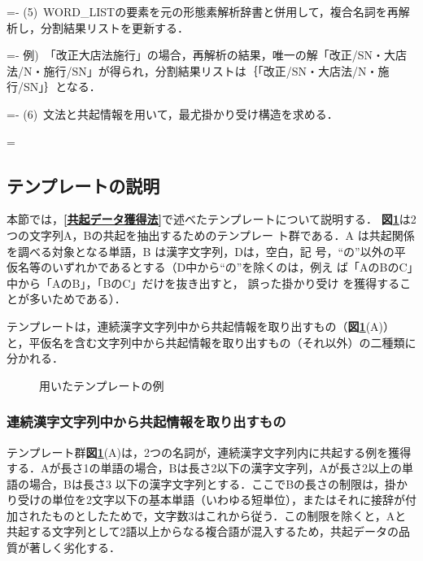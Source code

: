 \settowidth{\leftskip}{(5)\ }
\settowidth{\parindent}{(5)\ }
\parindent=-\parindent
(5)\ WORD\_LISTの要素を元の形態素解析辞書と併用して，複合名詞を再解析し，分割結果リストを更新する．

\settowidth{\parindent}{例)\ }
\parindent=-\parindent
例)\ 「改正大店法施行」の場合，再解析の結果，唯一の解「改正/SN・大店法/N・施行/SN」が得られ，分割結果リストは｛「改正/SN・大店法/N・施行/SN」｝となる．

\settowidth{\leftskip}{(6)\ }
\settowidth{\parindent}{(6)\ }
\parindent=-\parindent
(6)\ 文法と共起情報を用いて，最尤掛かり受け構造を求める．

\parindent=\originalparindent
\leftskip=0mm
\rightskip=0mm

\subsection{テンプレートの説明}\label{テンプレートの説明}
本節では，{\bf \ref{共起データ獲得法}}で述べたテンプレートについて説明する．
{\bf 図\ref{fig:templates}}は2つの文字列A，Bの共起を抽出するためのテンプレー
ト群である．A は共起関係を調べる対象となる単語，B は漢字文字列，Dは，空白，記
号，“の”以外の平仮名等のいずれかであるとする（D中から“の”を除くのは，例え
ば「AのBのC」中から「AのB」，「BのC」だけを抜き出すと，
誤った掛かり受け\break
を獲得することが多いためである）．

テンプレートは，連続漢字文字列中から共起情報を取り出すもの（{\bf 図\ref{fig:templates}}(A)）と，平仮名を含む文字列中から共起情報を取り出すもの（それ以外）の二種類に分かれる．

\begin{figure}[tbp]
  \begin{center}
    \leavevmode
   \vspace{3mm}
  \end{center}
  \caption{用いたテンプレートの例}
  \label{fig:templates}
\end{figure}

\subsubsection{連続漢字文字列中から共起情報を取り出すもの}\label{連続漢字文字列中から共起情報を取り出すもの}
テンプレート群{\bf 図\ref{fig:templates}}(A)は，2つの名詞が，連続漢字文字列内に共起する例を獲得する．Aが長さ1の単語の場合，Bは長さ2以下の漢字文字列，Aが長さ2以上の単語の場合，Bは長さ3\break
以下の漢字文字列とする．ここでBの長さの制限は，掛かり受けの単位を2文字以下の基本単語（いわゆる短単位），またはそれに接辞が付加されたものとしたためで，文字数3はこれから従う．この制限を除くと，Aと共起する文字列として2語以上からなる複合語が混入するため，共起データの品質が著しく劣化する．


